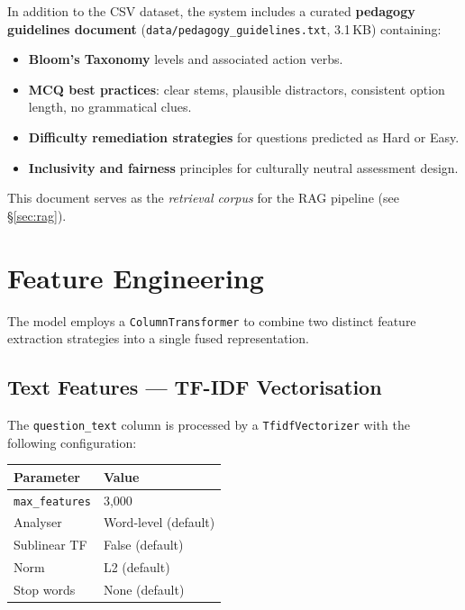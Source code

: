 \documentclass[12pt, a4paper, twoside]{article}
\newcommand{\code}[1]{\texttt{#1}}
\newcommand{\bref}[1]{\hyperref[#1]{\S\ref*{#1}}}
\begin{document}
In addition to the CSV dataset, the system includes a curated
\textbf{pedagogy guidelines document}
(\code{data/pedagogy\_guidelines.txt}, 3.1\,KB) containing:

\begin{itemize}[leftmargin=2em]
    \item \textbf{Bloom's Taxonomy} levels and associated action verbs.
    \item \textbf{MCQ best practices}: clear stems, plausible
          distractors, consistent option length, no grammatical clues.
    \item \textbf{Difficulty remediation strategies} for questions
          predicted as Hard or Easy.
    \item \textbf{Inclusivity and fairness} principles for
          culturally neutral assessment design.
\end{itemize}

\noindent This document serves as the \emph{retrieval corpus} for the
RAG pipeline (see \bref{sec:rag}).

\section{Feature Engineering}\label{sec:features}

The model employs a \code{ColumnTransformer} to combine two distinct
feature extraction strategies into a single fused representation.

\subsection{Text Features --- TF-IDF Vectorisation}

The \code{question\_text} column is processed by a
\code{TfidfVectorizer} with the following configuration:

\begin{center}
\renewcommand{\arraystretch}{1.2}
\begin{tabular}{ll}
    \toprule
    \textbf{Parameter} & \textbf{Value} \\
    \midrule
    \code{max\_features}   & 3{,}000 \\
    Analyser               & Word-level (default) \\
    Sublinear TF           & False (default) \\
    Norm                   & L2 (default) \\
    Stop words             & None (default) \\
    \bottomrule
\end{tabular}
\end{center}
\end{document}
